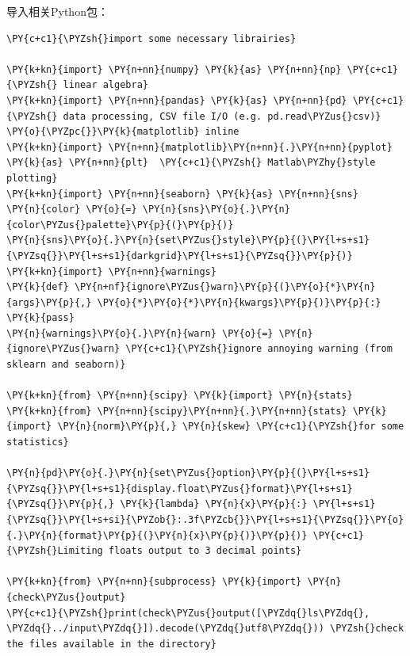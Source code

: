 \documentclass[no-math]{YangThesis}
\begin{document}
导入相关Python包：

\begin{tcolorbox}[breakable, size=fbox, boxrule=1pt, pad at break*=1mm,colback=cellbackground, colframe=cellborder]
	\begin{Verbatim}[commandchars=\\\{\}]
\PY{c+c1}{\PYZsh{}import some necessary librairies}
	
\PY{k+kn}{import} \PY{n+nn}{numpy} \PY{k}{as} \PY{n+nn}{np} \PY{c+c1}{\PYZsh{} linear algebra}
\PY{k+kn}{import} \PY{n+nn}{pandas} \PY{k}{as} \PY{n+nn}{pd} \PY{c+c1}{\PYZsh{} data processing, CSV file I/O (e.g. pd.read\PYZus{}csv)}
\PY{o}{\PYZpc{}}\PY{k}{matplotlib} inline
\PY{k+kn}{import} \PY{n+nn}{matplotlib}\PY{n+nn}{.}\PY{n+nn}{pyplot} \PY{k}{as} \PY{n+nn}{plt}  \PY{c+c1}{\PYZsh{} Matlab\PYZhy{}style plotting}
\PY{k+kn}{import} \PY{n+nn}{seaborn} \PY{k}{as} \PY{n+nn}{sns}
\PY{n}{color} \PY{o}{=} \PY{n}{sns}\PY{o}{.}\PY{n}{color\PYZus{}palette}\PY{p}{(}\PY{p}{)}
\PY{n}{sns}\PY{o}{.}\PY{n}{set\PYZus{}style}\PY{p}{(}\PY{l+s+s1}{\PYZsq{}}\PY{l+s+s1}{darkgrid}\PY{l+s+s1}{\PYZsq{}}\PY{p}{)}
\PY{k+kn}{import} \PY{n+nn}{warnings}
\PY{k}{def} \PY{n+nf}{ignore\PYZus{}warn}\PY{p}{(}\PY{o}{*}\PY{n}{args}\PY{p}{,} \PY{o}{*}\PY{o}{*}\PY{n}{kwargs}\PY{p}{)}\PY{p}{:}
\PY{k}{pass}
\PY{n}{warnings}\PY{o}{.}\PY{n}{warn} \PY{o}{=} \PY{n}{ignore\PYZus{}warn} \PY{c+c1}{\PYZsh{}ignore annoying warning (from sklearn and seaborn)}

\PY{k+kn}{from} \PY{n+nn}{scipy} \PY{k}{import} \PY{n}{stats}
\PY{k+kn}{from} \PY{n+nn}{scipy}\PY{n+nn}{.}\PY{n+nn}{stats} \PY{k}{import} \PY{n}{norm}\PY{p}{,} \PY{n}{skew} \PY{c+c1}{\PYZsh{}for some statistics}

\PY{n}{pd}\PY{o}{.}\PY{n}{set\PYZus{}option}\PY{p}{(}\PY{l+s+s1}{\PYZsq{}}\PY{l+s+s1}{display.float\PYZus{}format}\PY{l+s+s1}{\PYZsq{}}\PY{p}{,} \PY{k}{lambda} \PY{n}{x}\PY{p}{:} \PY{l+s+s1}{\PYZsq{}}\PY{l+s+si}{\PYZob{}:.3f\PYZcb{}}\PY{l+s+s1}{\PYZsq{}}\PY{o}{.}\PY{n}{format}\PY{p}{(}\PY{n}{x}\PY{p}{)}\PY{p}{)} \PY{c+c1}{\PYZsh{}Limiting floats output to 3 decimal points}

\PY{k+kn}{from} \PY{n+nn}{subprocess} \PY{k}{import} \PY{n}{check\PYZus{}output}
\PY{c+c1}{\PYZsh{}print(check\PYZus{}output([\PYZdq{}ls\PYZdq{}, \PYZdq{}../input\PYZdq{}]).decode(\PYZdq{}utf8\PYZdq{})) \PYZsh{}check the files available in the directory}
	\end{Verbatim}
\end{tcolorbox}
\end{document}
